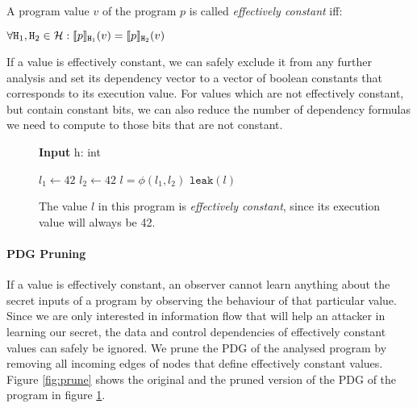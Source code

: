 \begin{definition}
    A program value $v$ of the program $p$ is called \emph{effectively constant} iff:
    \begin{center}
        $\forall \mathtt{H}_1, \mathtt{H}_2 \in \mathcal{H}: \llbracket p \rrbracket_{\mathtt{H}_1} (v) = \llbracket p \rrbracket_{\mathtt{H}_2}(v)$
    \end{center}
\end{definition}

If a value is effectively constant, we can safely exclude it from any further analysis and set its dependency vector to a vector of boolean constants that corresponds to its execution value. For values which are not effectively constant, but contain constant bits, we can also reduce the number of dependency formulas we need to compute to those bits that are not constant.


\begin{figure}
    \centering
    \begin{minipage}{.7\linewidth}
        \begin{algorithm}[H]
            \hspace*{\algorithmicindent} \textbf{Input} h: int \\
            \hspace{1em}
            \begin{algorithmic}[1]
                \State $l_1 \leftarrow 42$
                \Else
                \State $l_2 \leftarrow 42$
                \EndIf
                \State $l = \phi(l_1, l_2)$
                \State $\mathtt{leak}(l)$
            \end{algorithmic}
        \end{algorithm}
    \end{minipage}
    \caption{The value $l$ in this program is \emph{effectively constant}, since its execution value will always be 42.}
    \label{fig:ec}
\end{figure}

\paragraph{PDG Pruning}
If a value is effectively constant, an observer cannot learn anything about the secret inputs of a program by observing the behaviour of that particular value. Since we are only interested in information flow that will help an attacker in learning our secret, the data and control dependencies of effectively constant values can safely be ignored.  We prune the PDG of the analysed program by removing all incoming edges of nodes that define effectively constant values. Figure \ref{fig:prune} shows the original and the pruned version of the PDG of the program in figure \ref{fig:ec}.

